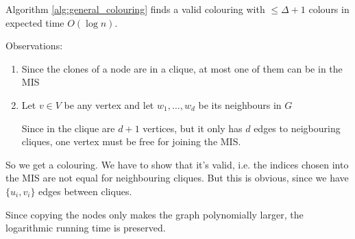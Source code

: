 \begin{thm} Algorithm \ref{alg:general_colouring} finds a valid colouring with $\leq \Delta+1$ colours in expected time $O(\log n)$.\end{thm}

\begin{pr} Observations:

\begin{enumerate}
\item Since the clones of a node are in a clique, at most one of them can be in the MIS
\item Let $v\in V$ be any vertex and let $w_1,\ldots,w_d$ be its neighbours in $G$

Since in the clique are $d+1$ vertices, but it only has $d$ edges to neigbouring cliques, one vertex must be free for joining the MIS.

\end{enumerate}

So we get a colouring. We have to show that it's valid, i.e. the indices chosen into the MIS are not equal for neighbouring cliques. But this is obvious, since we have $\{u_i,v_i\}$ edges between cliques.

Since copying the nodes only makes the graph polynomially larger, the logarithmic running time is preserved.
\end{pr}
